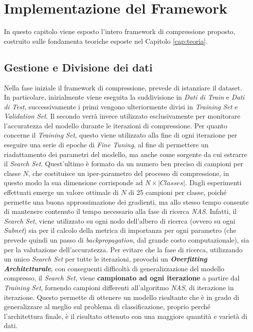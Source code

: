 \chapter{Implementazione del Framework}
In questo capitolo viene esposto l'intero framework di compressione proposto, costruito sulle fondamenta teoriche esposte nel Capitolo \ref{cap:teoria}.

\section{Gestione e Divisione dei dati}
Nella fase iniziale il framework di compressione, prevede di istanziare il dataset. In particolare, inizialmente viene eseguita la suddivisione in \textit{Dati di Train} e \textit{Dati di Test}, successivamente i primi vengono ulteriormente divisi in \textit{Training Set} e \textit{Validation Set}. Il secondo verrà invece utilizzato esclusivamente per monitorare l'accuratezza del modello durante le iterazioni di compressione. Per quanto concerne il \textit{Training Set}, questo viene utilizzato alla fine di ogni iterazione per eseguire una serie di epoche di \textit{Fine Tuning}, al fine di permettere un riadattamento dei parametri del modello, ma anche come sorgente da cui estrarre il \textit{Search Set}. \newline
Quest'ultimo è formato da un numero ben preciso di campioni per classe $N$, che costituisce un iper-parametro del processo di compressione, in questo modo la sua dimensione corrisponde ad $N \times |Classes|$. Dagli esperimenti effettuati emerge un valore ottimale di $N$ di 25 campioni per classe, poiché permette una buona approssimazione dei gradienti, ma allo stesso tempo consente di mantenere contenuto il tempo necessario alla fase di ricerca \textit{NAS}. Infatti, il \textit{Search Set}, viene utilizzato su ogni nodo dell'albero di ricerca (ovvero su ogni \textit{Subnet}) sia per il calcolo della metrica di importanza per ogni parametro (che prevede quindi un passo di \textit{backpropagation}, dal grande costo computazionale), sia per la valutazione dell'accuratezza. \newline 
Per evitare che la fase di ricerca, utilizzando un unico \textit{Search Set} per tutte le iterazioni, provochi un \textit{\textbf{Overfitting Architetturale}}, con conseguenti difficoltà di generalizzazione del modello compresso, il \textit{Search Set}, viene \textbf{campionato ad ogni iterazione} a partire dal \textit{Training Set}, fornendo campioni differenti all'algoritmo \textit{NAS}, di iterazione in iterazione. Questo permette di ottenere un modello risultante che è in grado di generalizzare al meglio sul problema di classificazione, proprio perché l'architettura finale, è il risultato ottenuto con una maggiore quantità e varietà di dati. \newline
